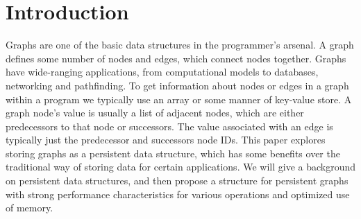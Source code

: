 \documentclass[preprint]{sigplanconf}
\begin{document}
\section{Introduction}
Graphs are one of the basic data structures in the programmer's arsenal.
A graph defines some number of nodes and edges, which connect nodes together.
Graphs have wide-ranging applications, from computational models to databases, networking and pathfinding.
To get information about nodes or edges in a graph within a program we typically use an array or some manner of key-value store.
A graph node's value is usually a list of adjacent nodes, which are either predecessors to that node or successors.
The value associated with an edge is typically just the predecessor and successors node IDs.
This paper explores storing graphs as a persistent data structure, which has some benefits over the traditional way of storing data for certain applications.
We will give a background on persistent data structures, and then propose a structure for persistent graphs with strong performance characteristics for various operations and optimized use of memory.
\end{document}
